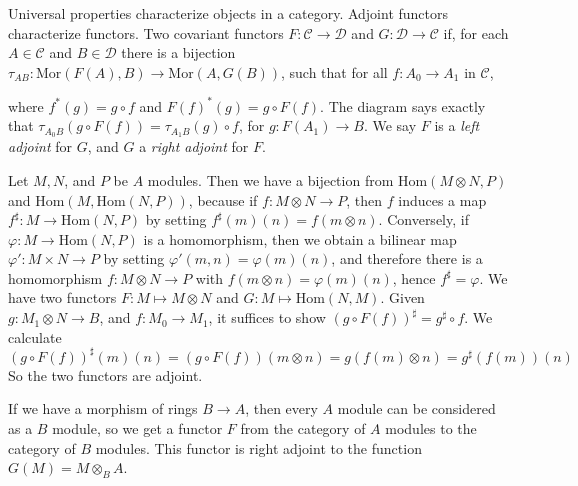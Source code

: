 Universal properties characterize objects in a category. Adjoint functors characterize functors. Two covariant functors $F: \mathcal{C} \to \mathcal{D}$ and $G: \mathcal{D} \to \mathcal{C}$ if, for each $A \in \mathcal{C}$ and $B \in \mathcal{D}$ there is a bijection $\tau_{AB}: \text{Mor}(F(A),B) \to \text{Mor}(A,G(B))$, such that for all $f: A_0 \to A_1$ in $\mathcal{C}$,
%
\begin{center}
\end{center}
%
where $f^*(g) = g \circ f$ and $F(f)^*(g) = g \circ F(f)$. The diagram says exactly that $\tau_{A_0B}(g \circ F(f)) = \tau_{A_1B}(g) \circ f$, for $g: F(A_1) \to B$. We say $F$ is a {\it left adjoint} for $G$, and $G$ a {\it right adjoint} for $F$.

\begin{example}
    Let $M,N$, and $P$ be $A$ modules. Then we have a bijection from $\text{Hom}(M \otimes N, P)$ and $\text{Hom}(M, \text{Hom}(N,P))$, because if $f: M \otimes N \to P$, then $f$ induces a map $f^\sharp: M \to \text{Hom}(N,P)$ by setting $f^\sharp(m)(n) = f(m \otimes n)$. Conversely, if $\varphi: M \to \text{Hom}(N,P)$ is a homomorphism, then we obtain a bilinear map $\varphi': M \times N \to P$ by setting $\varphi'(m,n) = \varphi(m)(n)$, and therefore there is a homomorphism $f: M \otimes N \to P$ with $f(m \otimes n) = \varphi(m)(n)$, hence $f^\sharp = \varphi$. We have two functors $F: M \mapsto M \otimes N$ and $G: M \mapsto \text{Hom}(N,M)$. Given $g: M_1 \otimes N \to B$, and $f: M_0 \to M_1$, it suffices to show $(g \circ F(f))^\sharp = g^\sharp \circ f$. We calculate
    \[ (g \circ F(f))^\sharp(m)(n) = (g \circ F(f))(m \otimes n) = g(f(m) \otimes n) = g^\sharp(f(m))(n) \]
    So the two functors are adjoint.
\end{example}

\begin{example}
    If we have a morphism of rings $B \to A$, then every $A$ module can be considered as a $B$ module, so we get a functor $F$ from the category of $A$ modules to the category of $B$ modules. This functor is right adjoint to the function $G(M) = M \otimes_B A$.
\end{example}

